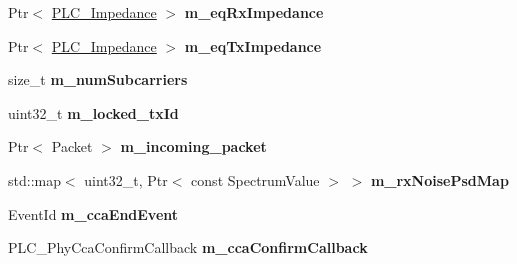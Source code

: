 \begin{DoxyCompactItemize}
\item 
\hypertarget{classns3_1_1PLC__HalfDuplexOfdmPhy_a9738f5edb93b5ae8b115fd8ccbfdc02b}{\-Ptr$<$ \hyperlink{classns3_1_1PLC__ValueBase}{\-P\-L\-C\-\_\-\-Impedance} $>$ {\bfseries m\-\_\-eq\-Rx\-Impedance}}\label{classns3_1_1PLC__HalfDuplexOfdmPhy_a9738f5edb93b5ae8b115fd8ccbfdc02b}

\item 
\hypertarget{classns3_1_1PLC__HalfDuplexOfdmPhy_afc47d34c0d11b856a3a9d47ca8acb607}{\-Ptr$<$ \hyperlink{classns3_1_1PLC__ValueBase}{\-P\-L\-C\-\_\-\-Impedance} $>$ {\bfseries m\-\_\-eq\-Tx\-Impedance}}\label{classns3_1_1PLC__HalfDuplexOfdmPhy_afc47d34c0d11b856a3a9d47ca8acb607}

\item 
\hypertarget{classns3_1_1PLC__HalfDuplexOfdmPhy_a21275e992aeaab6db7ff1d5f64642c89}{size\-\_\-t {\bfseries m\-\_\-num\-Subcarriers}}\label{classns3_1_1PLC__HalfDuplexOfdmPhy_a21275e992aeaab6db7ff1d5f64642c89}

\item 
\hypertarget{classns3_1_1PLC__HalfDuplexOfdmPhy_a48d7b548415d35b20310a9e94740a69e}{uint32\-\_\-t {\bfseries m\-\_\-locked\-\_\-tx\-Id}}\label{classns3_1_1PLC__HalfDuplexOfdmPhy_a48d7b548415d35b20310a9e94740a69e}

\item 
\hypertarget{classns3_1_1PLC__HalfDuplexOfdmPhy_a710307e53b6eb64d73d2f494a0dd662b}{\-Ptr$<$ \-Packet $>$ {\bfseries m\-\_\-incoming\-\_\-packet}}\label{classns3_1_1PLC__HalfDuplexOfdmPhy_a710307e53b6eb64d73d2f494a0dd662b}

\item 
\hypertarget{classns3_1_1PLC__HalfDuplexOfdmPhy_ad6f4ab3078f989d354c3d85acf345d07}{std\-::map$<$ uint32\-\_\-t, \-Ptr$<$ const \*
\-Spectrum\-Value $>$ $>$ {\bfseries m\-\_\-rx\-Noise\-Psd\-Map}}\label{classns3_1_1PLC__HalfDuplexOfdmPhy_ad6f4ab3078f989d354c3d85acf345d07}

\item 
\hypertarget{classns3_1_1PLC__HalfDuplexOfdmPhy_a665c5ac94fc11ce28a4e339a44210b00}{\-Event\-Id {\bfseries m\-\_\-cca\-End\-Event}}\label{classns3_1_1PLC__HalfDuplexOfdmPhy_a665c5ac94fc11ce28a4e339a44210b00}

\item 
\hypertarget{classns3_1_1PLC__HalfDuplexOfdmPhy_a97a8264fc6b8ecc64f171fd123fbaf45}{\-P\-L\-C\-\_\-\-Phy\-Cca\-Confirm\-Callback {\bfseries m\-\_\-cca\-Confirm\-Callback}}\label{classns3_1_1PLC__HalfDuplexOfdmPhy_a97a8264fc6b8ecc64f171fd123fbaf45}


\end{DoxyCompactItemize}
